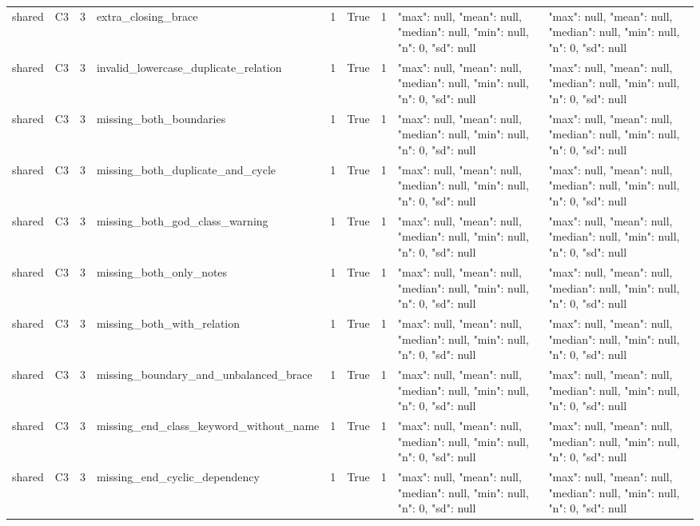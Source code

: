 \begin{tabular}{lllllllll}
shared & C3 & 3 & extra\_closing\_brace & 1 & True & 1 & {"max": null, "mean": null, "median": null, "min": null, "n": 0, "sd": null} & {"max": null, "mean": null, "median": null, "min": null, "n": 0, "sd": null} \\
shared & C3 & 3 & invalid\_lowercase\_duplicate\_relation & 1 & True & 1 & {"max": null, "mean": null, "median": null, "min": null, "n": 0, "sd": null} & {"max": null, "mean": null, "median": null, "min": null, "n": 0, "sd": null} \\
shared & C3 & 3 & missing\_both\_boundaries & 1 & True & 1 & {"max": null, "mean": null, "median": null, "min": null, "n": 0, "sd": null} & {"max": null, "mean": null, "median": null, "min": null, "n": 0, "sd": null} \\
shared & C3 & 3 & missing\_both\_duplicate\_and\_cycle & 1 & True & 1 & {"max": null, "mean": null, "median": null, "min": null, "n": 0, "sd": null} & {"max": null, "mean": null, "median": null, "min": null, "n": 0, "sd": null} \\
shared & C3 & 3 & missing\_both\_god\_class\_warning & 1 & True & 1 & {"max": null, "mean": null, "median": null, "min": null, "n": 0, "sd": null} & {"max": null, "mean": null, "median": null, "min": null, "n": 0, "sd": null} \\
shared & C3 & 3 & missing\_both\_only\_notes & 1 & True & 1 & {"max": null, "mean": null, "median": null, "min": null, "n": 0, "sd": null} & {"max": null, "mean": null, "median": null, "min": null, "n": 0, "sd": null} \\
shared & C3 & 3 & missing\_both\_with\_relation & 1 & True & 1 & {"max": null, "mean": null, "median": null, "min": null, "n": 0, "sd": null} & {"max": null, "mean": null, "median": null, "min": null, "n": 0, "sd": null} \\
shared & C3 & 3 & missing\_boundary\_and\_unbalanced\_brace & 1 & True & 1 & {"max": null, "mean": null, "median": null, "min": null, "n": 0, "sd": null} & {"max": null, "mean": null, "median": null, "min": null, "n": 0, "sd": null} \\
shared & C3 & 3 & missing\_end\_class\_keyword\_without\_name & 1 & True & 1 & {"max": null, "mean": null, "median": null, "min": null, "n": 0, "sd": null} & {"max": null, "mean": null, "median": null, "min": null, "n": 0, "sd": null} \\
shared & C3 & 3 & missing\_end\_cyclic\_dependency & 1 & True & 1 & {"max": null, "mean": null, "median": null, "min": null, "n": 0, "sd": null} & {"max": null, "mean": null, "median": null, "min": null, "n": 0, "sd": null} \\

\end{tabular}
